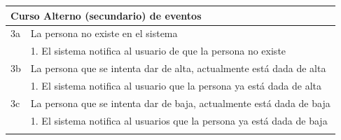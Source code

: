 \begin{table}[h!]
{\begin{tabular}{|l|l|l|l|}
        \hline
        \multicolumn{4}{|l|}{{\cellcolor[rgb]{0.886,0.886,0.886}}\textbf{Curso Alterno (secundario) de eventos}}                                                                                                                                                                                          \\ 
        \hline
        3a & \multicolumn{3}{l|}{La persona no existe en el sistema}                                                                                                                                                                                                                                      \\ 
        \hline
        & \multicolumn{3}{l|}{1. El sistema notifica al usuario de que la persona no existe}                                                                                                                                                                                                           \\ 
        \hline
        3b & \multicolumn{3}{l|}{La persona que se intenta dar de alta, actualmente está dada de alta}                                                                                                                                                                                                    \\ 
        \hline
        & \multicolumn{3}{l|}{1. El sistema notifica al usuario que la persona ya está dada de alta}                                                                                                                                                                                                   \\ 
        \hline
        3c & \multicolumn{3}{l|}{La persona que se intenta dar de baja, actualmente está dada de baja}                                                                                                                                                                                                    \\ 
        \hline
        & \multicolumn{3}{l|}{1. El sistema notifica al usuarios que la persona ya está dada de baja}                                                                                                                                                                                                  \\ 
        \hline
        \multicolumn{4}{l}{}                                                                                                                                                                                                                                                                              \\ 

\end{tabular}}
\end{table}
